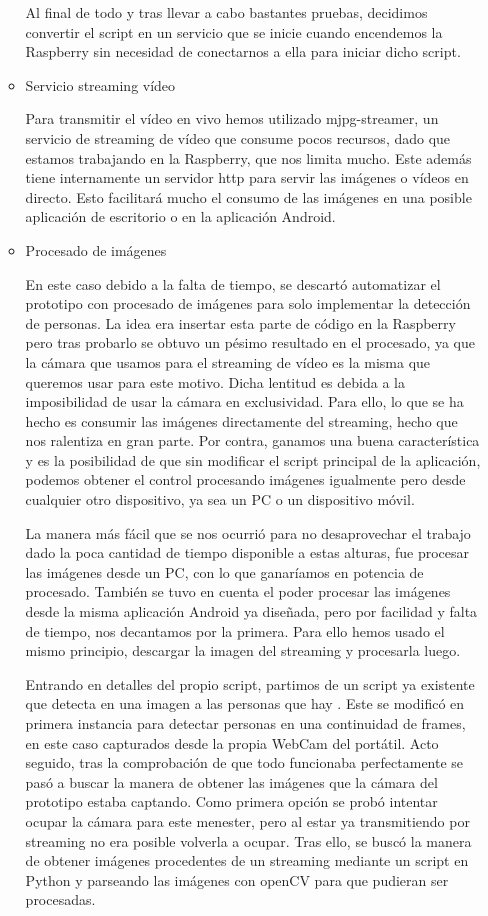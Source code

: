 \documentclass{pclass}
\begin{document}
\begin{itemize}
\begin{itemize}
	Al final de todo y tras llevar a cabo bastantes pruebas, decidimos convertir el script en un servicio que se inicie cuando encendemos la Raspberry sin necesidad de conectarnos a ella para iniciar dicho script.	\cite{servicio}
	
	\medskip
	
	\item Servicio streaming vídeo
	
	Para transmitir el vídeo en vivo hemos utilizado mjpg-streamer, un servicio de streaming de vídeo que consume pocos recursos, dado que estamos trabajando en la Raspberry, que nos limita mucho. Este además tiene internamente un servidor http para servir las imágenes o vídeos en directo. Esto facilitará mucho el consumo de las imágenes en una posible aplicación de escritorio o en la aplicación Android.
	
	\medskip
	
	\item Procesado de imágenes
	
		En este caso debido a la falta de tiempo, se descartó automatizar el prototipo con procesado de imágenes para solo implementar la detección de personas. La idea era insertar esta parte de código en la Raspberry pero tras probarlo se obtuvo un pésimo resultado en el procesado, ya que la cámara que usamos para el streaming de vídeo es la misma que queremos usar para este motivo. Dicha lentitud es debida a la imposibilidad de usar la cámara en exclusividad. Para ello, lo que se ha hecho es consumir las imágenes directamente del streaming, hecho que nos ralentiza en gran parte. Por contra, ganamos una buena característica y es la posibilidad de que sin modificar el script principal de la aplicación, podemos obtener el control procesando imágenes igualmente pero desde cualquier otro dispositivo, ya sea un PC o un dispositivo móvil.
		
		La manera más fácil que se nos ocurrió para no desaprovechar el trabajo dado la poca cantidad de tiempo disponible a estas alturas, fue procesar las imágenes desde un PC, con lo que ganaríamos en potencia de procesado. También se tuvo en cuenta el poder procesar las imágenes desde la misma aplicación Android ya diseñada, pero por facilidad y falta de tiempo, nos decantamos por la primera. Para ello hemos usado el mismo principio, descargar la imagen del streaming y procesarla luego. 
		
		Entrando en detalles del propio script, partimos de un script ya existente que detecta en una imagen a las personas que hay \cite{pedestrian}. Este se modificó en primera instancia para detectar personas en una continuidad de frames, en este caso capturados desde la propia WebCam del portátil. Acto seguido, tras la comprobación de que todo funcionaba perfectamente se pasó a buscar la manera de obtener las imágenes que la cámara del prototipo estaba captando. Como primera opción se probó intentar ocupar la cámara para este menester, pero al estar ya transmitiendo por streaming no era posible volverla a ocupar. Tras ello, se buscó la manera de obtener imágenes procedentes de un streaming mediante un script en Python y parseando las imágenes con openCV para que pudieran ser procesadas.
		

\end{itemize}
\end{itemize}
\end{document}
